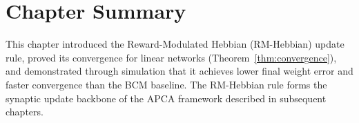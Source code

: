 \section{Chapter Summary}

This chapter introduced the Reward-Modulated Hebbian (RM-Hebbian) update rule, proved
its convergence for linear networks (Theorem~\ref{thm:convergence}), and demonstrated
through simulation that it achieves lower final weight error and faster convergence than
the BCM baseline.  The RM-Hebbian rule forms the synaptic update backbone of the APCA
framework described in subsequent chapters.

